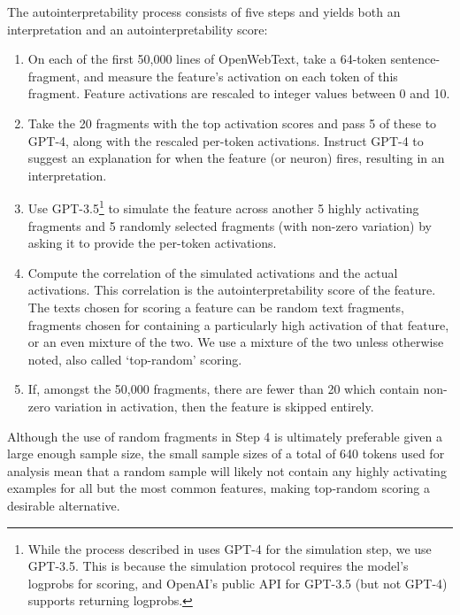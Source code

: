 The autointerpretability process consists of five steps and yields both an interpretation and an autointerpretability score:

\begin{enumerate}
    \item On each of the first 50,000 lines of OpenWebText, take a 64-token sentence-fragment, and measure the feature's activation on each token of this fragment. Feature activations are rescaled to integer values between 0 and 10.
    \item Take the 20 fragments with the top activation scores and pass 5 of these to GPT-4, along with the rescaled per-token activations. Instruct GPT-4 to suggest an explanation for when the feature (or neuron) fires, resulting in an interpretation.
    \item Use GPT-3.5\footnote{While the process described in \citet{bills2023language} uses GPT-4 for the simulation step, we use GPT-3.5. This is because the simulation protocol requires the model's logprobs for scoring, and OpenAI's public API for GPT-3.5 (but not GPT-4) supports returning logprobs.} to simulate the feature across another 5 highly activating fragments and 5 randomly selected fragments (with non-zero variation) by asking it to provide the per-token activations.
    \item Compute the correlation of the simulated activations and the actual activations. This correlation is the autointerpretability score of the feature. The texts chosen for scoring a feature can be random text fragments, fragments chosen for containing a particularly high activation of that feature, or an even mixture of the two. We use a mixture of the two unless otherwise noted, also called `top-random' scoring.
    \item If, amongst the 50,000 fragments, there are fewer than 20 which contain non-zero variation in activation, then the feature is skipped entirely.
\end{enumerate}

Although the use of random fragments in Step 4 is ultimately preferable given a large enough sample size, the small sample sizes of a total of 640 tokens used for analysis mean that a random sample will likely not contain any highly activating examples for all but the most common features, making top-random scoring a desirable alternative.
